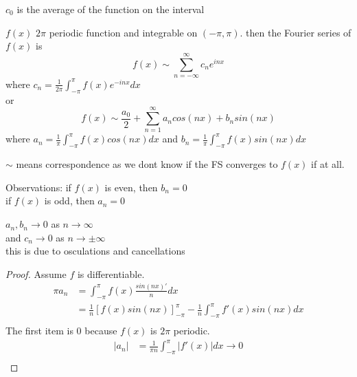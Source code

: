 \documentclass[answers,12pt,addpoints]{exam}
\begin{document}
\begin{remark}
    $c_0$ is the average of the function on the interval
\end{remark}
\begin{definition}
    $f(x)$ $2\pi$ periodic function and integrable on $(-\pi, \pi)$. then the Fourier series of $f(x)$ is
    $$ f(x) \sim \sum_{n=-\infty}^{\infty} c_n e^{inx}$$
    where $c_n = \frac{1}{2\pi} \int_{-\pi}^{\pi} f(x) e^{-inx} dx$\\
    or 
    $$ f(x) \sim \frac{a_0}{2} + \sum_{n=1}^{\infty} a_n cos(nx) + b_n sin(nx)$$
    where $a_n = \frac{1}{\pi} \int_{-\pi}^{\pi} f(x) cos(nx) dx$ and $b_n = \frac{1}{\pi} \int_{-\pi}^{\pi} f(x) sin(nx) dx$
\end{definition}
\begin{remark}
    $\sim$ means correspondence as we dont know if the FS converges to $f(x)$ if at all.
\end{remark}
Observations:
if $f(x)$ is even, then $b_n = 0$\\
if $f(x)$ is odd, then $a_n = 0$\\
\begin{remark}
    $a_n, b_n \to 0$ as $n \to \infty$\\
    and $c_n \to 0$  as $n \to \pm\infty$ \\
    this is due to osculations and cancellations\\
    \begin{proof}
        Assume $f$ is differentiable. \\
        \begin{align*}
            \pi a_n &= \int_{-\pi}^{\pi} f(x) \frac{sin(nx)'}{n} dx\\
            &= \frac{1}{n} \left[ f(x)sin(nx) \right]_{-\pi}^{\pi} - \frac{1}{n} \int_{-\pi}^{\pi} f'(x) sin(nx) dx\\
        \end{align*}
        The first item is 0 because $f(x)$ is $2\pi$ periodic.\\
        \begin{align*}
            |a_n| &= \frac{1}{\pi n} \int_{-\pi}^{\pi} |f'(x)| dx \to 0 \\
        \end{align*}
    \end{proof}
\end{remark}
\end{document}

